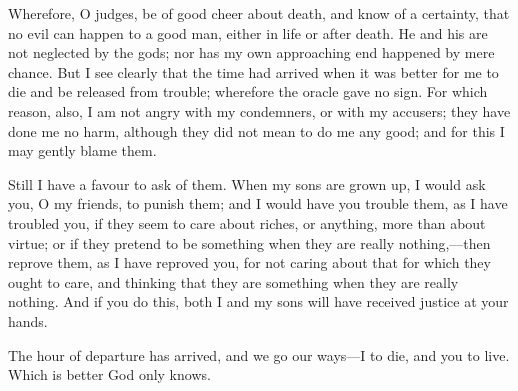 \documentclass[11pt,letter]{article}
\begin{document}
\par  Wherefore, O judges, be of good cheer about death, and know of a certainty, that no evil can happen to a good man, either in life or after death. He and his are not neglected by the gods; nor has my own approaching end happened by mere chance. But I see clearly that the time had arrived when it was better for me to die and be released from trouble; wherefore the oracle gave no sign. For which reason, also, I am not angry with my condemners, or with my accusers; they have done me no harm, although they did not mean to do me any good; and for this I may gently blame them.

\par  Still I have a favour to ask of them. When my sons are grown up, I would ask you, O my friends, to punish them; and I would have you trouble them, as I have troubled you, if they seem to care about riches, or anything, more than about virtue; or if they pretend to be something when they are really nothing,—then reprove them, as I have reproved you, for not caring about that for which they ought to care, and thinking that they are something when they are really nothing. And if you do this, both I and my sons will have received justice at your hands.

\par  The hour of departure has arrived, and we go our ways—I to die, and you to live. Which is better God only knows.

\par 
 
\end{document}

